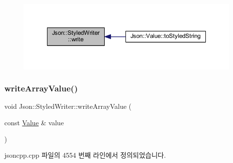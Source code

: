 \begin{figure}[H]
\begin{center}
\leavevmode
\includegraphics[width=348pt]{class_json_1_1_styled_writer_a5efab19b9746da9920c29cdae3a6b404_icgraph}
\end{center}
\end{figure}
\mbox{\label{class_json_1_1_styled_writer_a0618c23d62965515def15ece1e677f5d}} 
\subsubsection{\texorpdfstring{write\+Array\+Value()}{writeArrayValue()}}
{\footnotesize\ttfamily void Json\+::\+Styled\+Writer\+::write\+Array\+Value (\begin{DoxyParamCaption}\item[{const \hyperlink{class_json_1_1_value}{Value} \&}]{value }\end{DoxyParamCaption})\hspace{0.3cm}{\ttfamily [private]}}



jsoncpp.\+cpp 파일의 4554 번째 라인에서 정의되었습니다.


